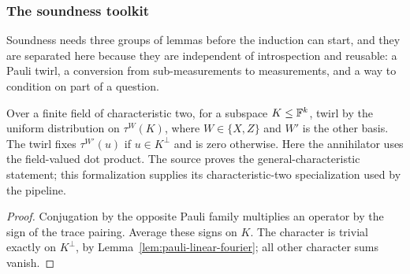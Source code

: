 \subsubsection{The soundness toolkit}

Soundness needs three groups of lemmas before the induction can start, and they are
separated here because they are independent of introspection and reusable: a Pauli twirl, a
conversion from sub-measurements to measurements, and a way to condition on part of a
question.

\effortHard

\begin{lemma}
\label{lem:pauli-twirl}
\leanok
Over a finite field of characteristic two, for a subspace $K\leq\mathbb{F}^k$, twirl by the uniform distribution on
$\tau^W(K)$, where $W\in\{X,Z\}$ and $W'$ is the other basis.
The twirl fixes $\tau^{W'}(u)$ if $u\in K^\perp$ and is zero otherwise.
Here the annihilator uses the field-valued dot product. The source proves the
general-characteristic statement; this formalization supplies its characteristic-two
specialization used by the pipeline.
\end{lemma}
\begin{proof}
\leanok
Conjugation by the opposite Pauli family multiplies an operator by the sign of
the trace pairing. Average these signs on $K$. The character is trivial exactly
on $K^\perp$, by Lemma~\ref{lem:pauli-linear-fourier}; all other character sums vanish.
\end{proof}

